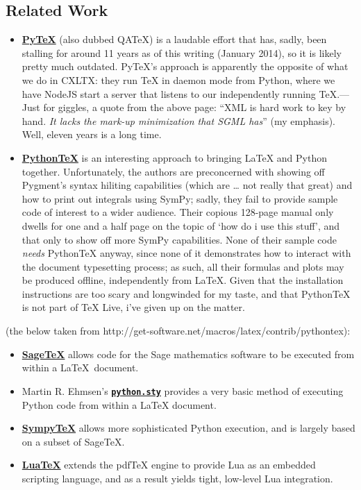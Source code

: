 \subsection{Related Work}\label{related-work}

\begin{itemize}
\item
  \href{http://www.pytex.org/}{\textbf{PyTeX}} (also dubbed QATeX) is a
  laudable effort that has, sadly, been stalling for around 11 years as
  of this writing (January 2014), so it is likely pretty much outdated.
  PyTeX's approach is apparently the opposite of what we do in CXLTX:
  they run TeX in daemon mode from Python, where we have NodeJS start a
  server that listens to our independently running TeX.---Just for
  giggles, a quote from the above page: ``XML is hard work to key by
  hand. \emph{It lacks the mark-up minimization that SGML has}'' (my
  emphasis). Well, eleven years is a long time.
\item
  \href{https://github.com/gpoore/pythontex}{\textbf{PythonTeX}} is an
  interesting approach to bringing LaTeX and Python together.
  Unfortunately, the authors are preconcerned with showing off Pygment's
  syntax hiliting capabilities (which are \ldots{} not really that
  great) and how to print out integrals using SymPy; sadly, they fail to
  provide sample code of interest to a wider audience. Their copious
  128-page manual only dwells for one and a half page on the topic of
  `how do i use this stuff', and that only to show off more SymPy
  capabilities. None of their sample code \emph{needs} PythonTeX anyway,
  since none of it demonstrates how to interact with the document
  typesetting process; as such, all their formulas and plots may be
  produced offline, independently from LaTeX. Given that the
  installation instructions are too scary and longwinded for my taste,
  and that PythonTeX is not part of TeX Live, i've given up on the
  matter.
\end{itemize}

(the below taken from
http://get-software.net/macros/latex/contrib/pythontex):

\begin{itemize}
\item
  \href{http://www.ctan.org/tex-archive/macros/latex/contrib/sagetex}{\textbf{SageTeX}}
  allows code for the Sage mathematics software to be executed from
  within a \LaTeX~document.
\item
  Martin R. Ehmsen's
  \href{http://www.ctan.org/pkg/python}{\textbf{\texttt{python.sty}}}
  provides a very basic method of executing Python code from within a
  LaTeX document.
\item
  \href{http://elec.otago.ac.nz/w/index.php/SympyTeX}{\textbf{SympyTeX}}
  allows more sophisticated Python execution, and is largely based on a
  subset of SageTeX.
\item
  \href{http://www.luatex.org/}{\textbf{LuaTeX}} extends the pdfTeX
  engine to provide Lua as an embedded scripting language, and as a
  result yields tight, low-level Lua integration.
\end{itemize}

